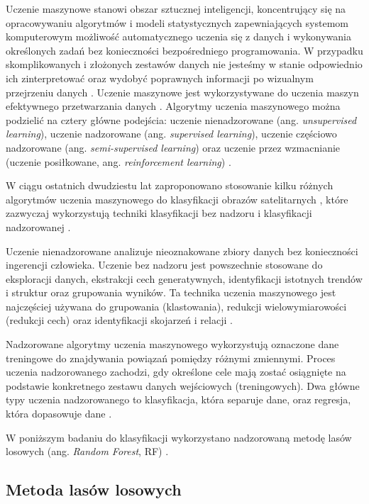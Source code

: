 \documentclass{amuthesis}
\begin{document}
Uczenie maszynowe stanowi obszar sztucznej inteligencji, koncentrujący
się na opracowywaniu algorytmów i modeli statystycznych zapewniających
systemom komputerowym możliwość automatycznego uczenia się z danych i
wykonywania określonych zadań bez konieczności bezpośredniego
programowania. W przypadku skomplikowanych i złożonych zestawów danych
nie jesteśmy w stanie odpowiednio ich zinterpretować oraz wydobyć
poprawnych informacji po wizualnym przejrzeniu danych
\autocite{mahesh_2019_ml}. Uczenie maszynowe jest wykorzystywane do
uczenia maszyn efektywnego przetwarzania danych
\autocite{sindayigaya_2022_ml}. Algorytmy uczenia maszynowego można
podzielić na cztery główne podejścia: uczenie nienadzorowane (ang.
\emph{unsupervised learning}), uczenie nadzorowane (ang.
\emph{supervised learning}), uczenie częściowo nadzorowane (ang.
\emph{semi-supervised learning}) oraz uczenie przez wzmacnianie (uczenie
posiłkowane, ang. \emph{reinforcement learning})
\autocite{sarker_2021_ml}.

W ciągu ostatnich dwudziestu lat zaproponowano stosowanie kilku różnych
algorytmów uczenia maszynowego do klasyfikacji obrazów satelitarnych
\autocite{sheykhmousa_2020_svm_vs_rf}, które zazwyczaj wykorzystują
techniki klasyfikacji bez nadzoru i klasyfikacji nadzorowanej
\autocite{ismail_2009_classification}.

Uczenie nienadzorowane analizuje nieoznakowane zbiory danych bez
konieczności ingerencji człowieka. Uczenie bez nadzoru jest powszechnie
stosowane do eksploracji danych, ekstrakcji cech generatywnych,
identyfikacji istotnych trendów i struktur oraz grupowania wyników. Ta
technika uczenia maszynowego jest najczęściej używana do grupowania
(klastowania), redukcji wielowymiarowości (redukcji cech) oraz
identyfikacji skojarzeń i relacji \autocite{sarker_2021_ml}.

Nadzorowane algorytmy uczenia maszynowego wykorzystują oznaczone dane
treningowe do znajdywania powiązań pomiędzy różnymi zmiennymi. Proces
uczenia nadzorowanego zachodzi, gdy określone cele mają zostać
osiągnięte na podstawie konkretnego zestawu danych wejściowych
(treningowych). Dwa główne typy uczenia nadzorowanego to klasyfikacja,
która separuje dane, oraz regresja, która dopasowuje dane
\autocite{sarker_2021_ml}.

W poniższym badaniu do klasyfikacji wykorzystano nadzorowaną metodę
lasów losowych (ang. \emph{Random Forest}, RF)
\autocite{breiman_2001_rf}.

\hypertarget{sec-random-forest}{%
\subsection{Metoda lasów losowych}\label{sec-random-forest}}
\end{document}
